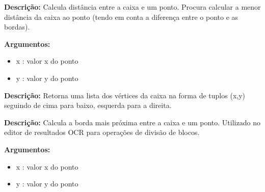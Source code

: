 
\textbf{Descrição:} Calcula distância entre a caixa e um ponto. Procura calcular a menor distância da caixa ao ponto (tendo em conta a diferença entre o ponto e as bordas).

\textbf{Argumentos:}
\begin{itemize}\setlength\itemsep{-0.3em}
	\vspace{-0.5em}
	\item x : valor x do ponto
	\item y : valor y do ponto
\end{itemize}


\textbf{Descrição:} Retorna uma lista dos vértices da caixa na forma de tuplos (x,y) seguindo de cima para baixo, esquerda para a direita.



\textbf{Descrição:} Calcula a borda mais próxima entre a caixa e um ponto. Utilizado no editor de resultados OCR para operações de divisão de blocos.

\textbf{Argumentos:}
\begin{itemize}\setlength\itemsep{-0.3em}
	\vspace{-0.5em}
	\item x : valor x do ponto
	\item y : valor y do ponto
\end{itemize}






